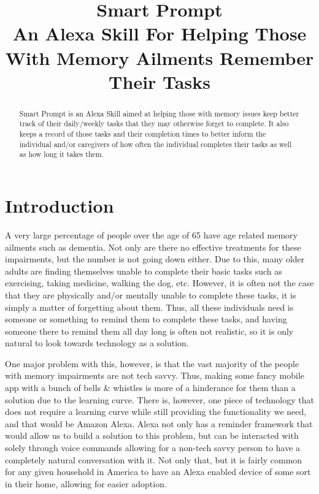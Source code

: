 \documentclass[conference]{IEEEtran}
\begin{document}
\title{Smart Prompt\\
{
\footnotesize An Alexa Skill For Helping Those With Memory Ailments Remember Their Tasks}
}

\author{
}

\maketitle

\begin{abstract}
Smart Prompt is an Alexa Skill aimed at helping those with memory issues keep better track of their daily/weekly tasks that they may otherwise forget to complete. 
It also keeps a record of those tasks and their completion times to better inform the individual and/or caregivers of how often the individual completes their tasks as well as how long it takes them. 
\end{abstract}

\section{Introduction}

A very large percentage of people over the age of 65 have age related memory ailments such as dementia.
Not only are there no effective treatments for these impairments, but the number is not going down either. 
Due to this, many older adults are finding themselves unable to complete their basic tasks such as exercising, taking medicine, walking the dog, etc.
However, it is often not the case that they are physically and/or mentally unable to complete these tasks, it is simply a matter of forgetting about them. 
Thus, all these individuals need is someone or something to remind them to complete these tasks, and having someone there to remind them all day long is often not realistic, so it is only natural to look towards technology as a solution. 

One major problem with this, however, is that the vast majority of the people with memory impairments are not tech savvy. 
Thus, making some fancy mobile app with a bunch of bells \& whistles is more of a hinderance for them than a solution due to the learning curve. 
There is, however, one piece of technology that does not require a learning curve while still providing the functionality we need, and that would be Amazon Alexa. 
Alexa not only has a reminder framework that would allow us to build a solution to this problem, but can be interacted with solely through voice commands allowing for a non-tech savvy person to have a completely natural conversation with it. 
Not only that, but it is fairly common for any given household in America to have an Alexa enabled device of some sort in their home, allowing for easier adoption. 
\end{document}

